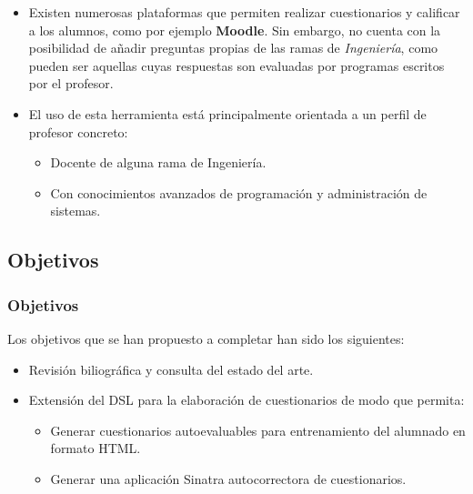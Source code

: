 \documentclass{beamer}
\begin{document}
\begin{frame}[allowframebreaks]
  \begin{itemize}
    \item Existen numerosas plataformas que permiten realizar cuestionarios y calificar a los alumnos, como por ejemplo {\bfseries Moodle}.
    Sin embargo, no cuenta con la posibilidad de añadir preguntas propias de las ramas de \textit{Ingeniería}, como pueden ser aquellas
    cuyas respuestas son evaluadas por programas escritos por el profesor.
    \item El uso de esta herramienta está principalmente orientada a un perfil de profesor concreto:
    \begin{itemize}
      \item Docente de alguna rama de Ingeniería.
      \item Con conocimientos avanzados de programación y administración de sistemas.
    \end{itemize}
  \end{itemize}
  
\end{frame}

\subsection{Objetivos}
\begin{frame}
  \frametitle{Objetivos}
  
  Los objetivos que se han propuesto a completar han sido los siguientes:
  \begin{itemize}
    \item Revisión biliográfica y consulta del estado del arte.
    \item Extensión del DSL para la elaboración de cuestionarios de modo que permita:
    \begin{itemize}
      \item Generar cuestionarios autoevaluables para entrenamiento del alumnado en formato HTML.
      \item Generar una aplicación Sinatra autocorrectora de cuestionarios.
    \end{itemize}
  \end{itemize}
\end{frame}

\end{document}
